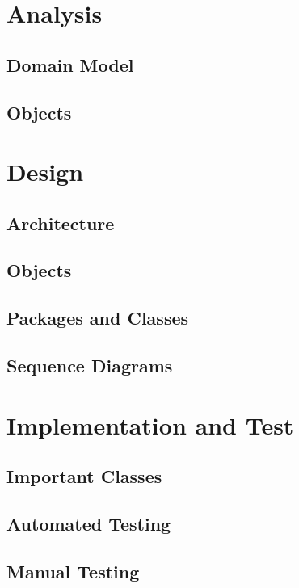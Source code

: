 \documentclass[a4paper,parskip=full]{scrreprt}
\begin{document}
\chapter{Analysis}
\section{Domain Model}
\section{Objects}

\chapter{Design}
\section{Architecture}
\section{Objects}
\section{Packages and Classes}
\section{Sequence Diagrams}

\chapter{Implementation and Test}
\section{Important Classes}
\section{Automated Testing}
\section{Manual Testing}
\end{document}
